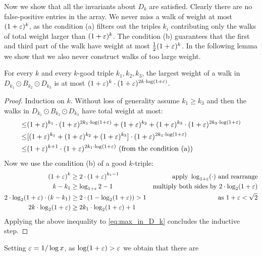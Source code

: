 Now we show that all the invariants about $D_k$ are satisfied.
Clearly there are no false-positive entries in the array.
We never miss a walk of weight at most $(1+\varepsilon)^k$, as the condition (a) filters out the triples $k_i$ contributing only the walks of total weight larger than $(1+\varepsilon)^k$.
The condition (b) guarantees that the first and third part of the walk have weight at most $\frac 12 (1+\varepsilon)^k$.
In the following lemma we show that we also never construct walks of too large weight.

\begin{lemma}\label{le:bound_max_weight}
 For every $k$ and every $k$-good triple $k_1,k_2,k_3$, the largest weight of a walk in $D_{k_1} \odot B_{k_2}\odot D_{k_3}$ is at most $(1+\varepsilon)^{k} \cdot (1+\varepsilon)^{2k\cdot\log(1+\varepsilon)}$.
\end{lemma}
\begin{proof}
Induction on $k$. 
Without loss of generality assume $k_1\geq k_3$ and then the walks in $D_{k_1} \odot B_{k_2}\odot D_{k_3}$ have total weight at most:
\begin{align}
\leq&(1+\varepsilon)^{k_1} \cdot (1+\varepsilon)^{2k_1\cdot\log(1+\varepsilon)} + (1+\varepsilon)^{k_2} + (1+\varepsilon)^{k_3} \cdot(1+\varepsilon)^{2k_3\cdot\log(1+\varepsilon)} \nonumber \\ 
\leq &[ (1+\varepsilon)^{k_1} + (1+\varepsilon)^{k_2} + (1+\varepsilon)^{k_3} ]\cdot (1+\varepsilon)^{2 k_1\cdot\log(1+\varepsilon)} \nonumber \\
 \leq &(1+\varepsilon)^{k+1} \cdot (1+\varepsilon)^{2 k_1\cdot\log(1+\varepsilon)} \text{ (from the condition (a))} \label{eq:max_in_D_k}
\end{align}
Now we use the condition (b) of a good $k$-triple:
\begin{align*}
\left(1+\varepsilon\right)^k &\ge 2\cdot\left(1+\varepsilon\right)^{k_1-1} &\text{apply } \log_{1+\varepsilon}(\cdot) \text{ and rearrange}\\
k-k_1 &\ge \log_{1+\varepsilon}2 -1 &\text{multiply both sides by } 2\cdot \log_2(1+\varepsilon)\\
2\cdot \log_2(1+\varepsilon) \cdot (k-k_1) &\ge 2\cdot (1-\log_2(1+\varepsilon)) > 1 &\text{as } 1+\varepsilon<\sqrt 2\\
2k\cdot\log_2(1+\varepsilon) & \ge 2k_1\cdot\log_2(1+\varepsilon) +1
\end{align*}
\noindent
Applying the above inequality to \eqref{eq:max_in_D_k} concludes the inductive step.
\end{proof}
\noindent
Setting $\varepsilon=1/\log x$, as $\log(1+\varepsilon)>\varepsilon$ we obtain that there are 
